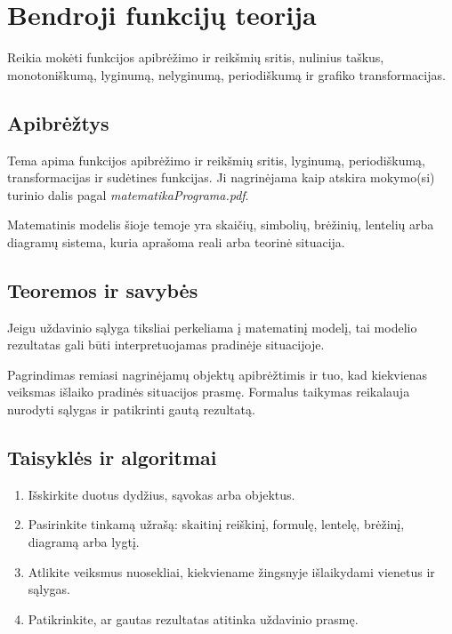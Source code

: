\section{Bendroji funkcijų teorija}\label{sec:bendroji-funkciju-teorija}

\begin{tcolorbox}[title=Prieš pradedant, colback=green!5]
Reikia mokėti funkcijos apibrėžimo ir reikšmių sritis, nulinius taškus, monotoniškumą, lyginumą, nelyginumą, periodiškumą ir grafiko transformacijas.
\end{tcolorbox}
\subsection{Apibrėžtys}
\begin{apibreztis}
Tema apima funkcijos apibrėžimo ir reikšmių sritis, lyginumą, periodiškumą, transformacijas ir sudėtines funkcijas. Ji nagrinėjama kaip atskira mokymo(si) turinio dalis pagal \emph{matematikaPrograma.pdf}.
\end{apibreztis}
\begin{apibreztis}
Matematinis modelis šioje temoje yra skaičių, simbolių, brėžinių, lentelių arba diagramų sistema, kuria aprašoma reali arba teorinė situacija.
\end{apibreztis}

\subsection{Teoremos ir savybės}
\begin{savybe}
Jeigu uždavinio sąlyga tiksliai perkeliama į matematinį modelį, tai modelio rezultatas gali būti interpretuojamas pradinėje situacijoje.
\end{savybe}
\begin{pastaba}
Pagrindimas remiasi nagrinėjamų objektų apibrėžtimis ir tuo, kad kiekvienas veiksmas išlaiko pradinės situacijos prasmę. Formalus taikymas reikalauja nurodyti sąlygas ir patikrinti gautą rezultatą.
\end{pastaba}

\subsection{Taisyklės ir algoritmai}
\begin{enumerate}[label=\arabic*.]
\item Išskirkite duotus dydžius, sąvokas arba objektus.
\item Pasirinkite tinkamą užrašą: skaitinį reiškinį, formulę, lentelę, brėžinį, diagramą arba lygtį.
\item Atlikite veiksmus nuosekliai, kiekviename žingsnyje išlaikydami vienetus ir sąlygas.
\item Patikrinkite, ar gautas rezultatas atitinka uždavinio prasmę.
\end{enumerate}

